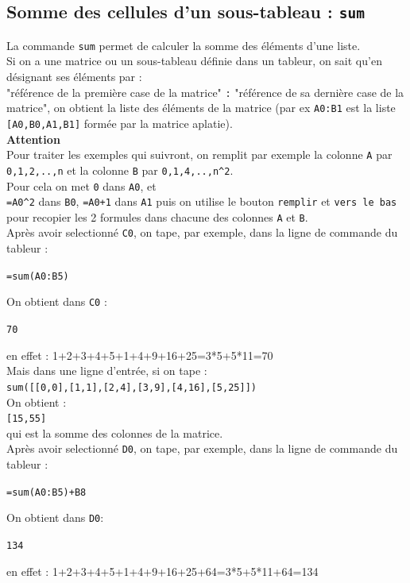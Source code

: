 \documentclass[a4paper,11pt]{book}
\begin{document}
\subsection{Somme des cellules d'un sous-tableau : {\tt sum}}\label{sec:sumex}
La commande {\tt sum} permet de calculer la somme des \'el\'ements d'une
liste.\\
Si on a une matrice ou un sous-tableau d\'efinie dans un tableur, on sait 
qu'en d\'esignant ses \'el\'ements par :\\ 
"r\'ef\'erence de la premi\`ere case de la matrice" {\tt :}  
"r\'ef\'erence de sa derni\`ere case de la matrice", on obtient la liste des 
\'el\'ements de la matrice (par ex {\tt A0:B1} est la liste {\tt [A0,B0,A1,B1]}
form\'ee par la matrice aplatie).\\
{\bf Attention}\\
Pour traiter les exemples qui suivront, on remplit par exemple la colonne 
{\tt A} par {\tt 0,1,2,..,n} et la colonne 
{\tt B} par {\tt 0,1,4,..,n\verb|^|2}.\\ 
Pour cela on met {\tt 0} dans {\tt A0}, et\\
{\tt =A0\verb|^|2} dans  {\tt B0}, {\tt =A0+1} dans {\tt A1} puis on utilise le
 bouton {\tt remplir} et {\tt vers le bas} pour recopier les 2 formules dans 
chacune des colonnes 
{\tt A} et {\tt B}.\\
Apr\`es avoir selectionn\'e {\tt C0}, on tape, par exemple, dans la ligne de 
commande du tableur :
\begin{center}{\tt =sum(A0:B5)}\end{center}
On obtient dans {\tt C0} :
\begin{center}{\tt 70}\end{center}
en effet : 1+2+3+4+5+1+4+9+16+25=3*5+5*11=70\\
Mais dans une ligne d'entr\'ee, si on tape :\\
{\tt sum([[0,0],[1,1],[2,4],[3,9],[4,16],[5,25]])}\\
On obtient :\\
{\tt [15,55]}\\
qui est la somme des colonnes de la matrice.\\
Apr\`es avoir selectionn\'e {\tt D0}, on tape, par exemple, dans la ligne de 
commande du tableur :
\begin{center}{\tt =sum(A0:B5)+B8}\end{center}
On obtient dans {\tt D0}:
\begin{center}{\tt 134}\end{center}
en effet : 1+2+3+4+5+1+4+9+16+25+64=3*5+5*11+64=134
\end{document}
